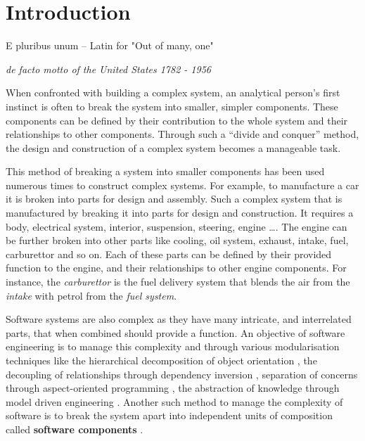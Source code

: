 \chapter{Introduction}
\label{introduction}
\epigraph{E pluribus unum -- Latin for "Out of many, one"}
{\textit{de facto motto of the United States 1782 - 1956}}

When confronted with building a complex system, an analytical person's first instinct is often to break the system into smaller, simpler components. 
These components can be defined by their contribution to the whole system and their relationships to other components.
Through such a ``divide and conquer'' method, the design and construction of a complex system becomes a manageable task.

This method of breaking a system into smaller components has been used numerous times to construct complex systems.
For example, to manufacture a car it is broken into parts for design and assembly.
Such a complex system that is manufactured by breaking it into parts for design and construction.
It requires a body, electrical system, interior, suspension, steering, engine \ldots. 
The engine can be further broken into other parts like cooling, oil system, exhaust, intake, fuel, carburettor and so on.
Each of these parts can be defined by their provided function to the engine, and their relationships to other engine components.
For instance, the \textit{carburettor} is the fuel delivery system that blends the air from the \textit{intake} with petrol from the \textit{fuel system}.

Software systems are also complex as they have many intricate, and interrelated parts, that when combined should provide a function.
An objective of software engineering is to manage this complexity and through various modularisation techniques like the hierarchical decomposition of object orientation \citep{cox1986}, 
the decoupling of relationships through dependency inversion \citep{martin1996dependency}, 
separation of concerns through aspect-oriented programming \citep{Kiczales1997},
the abstraction of knowledge through model driven engineering \citep{schmidt2006}. 
Another such method to manage the complexity of software is to break the system apart into independent units of composition called \textbf{software components} \citep{Szyperski2002}. 

